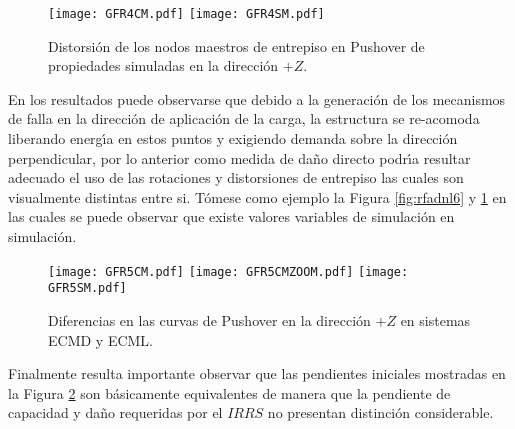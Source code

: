\begin{figure} [htbp]
\texttt{[image: GFR4CM.pdf]}
\texttt{[image: GFR4SM.pdf]}
\caption{Distorsi\'on de los nodos maestros de entrepiso en Pushover de propiedades simuladas en la direcci\'on $+Z$.}
\label{fig:rfadnl7}
\end{figure}

\newpage

En los resultados puede observarse que debido a la generaci\'on de los mecanismos de falla en la direcci\'on de aplicaci\'on de la carga, la estructura se re-acomoda liberando energ\'{\i}a en estos puntos y exigiendo demanda sobre la direcci\'on perpendicular, por lo anterior como medida de da\~no directo podr\'{\i}a resultar adecuado el uso de las rotaciones y distorsiones de entrepiso las cuales son visualmente distintas entre si. T\'omese como ejemplo la Figura \ref{fig:rfadnl6} y \ref{fig:rfadnl7} en las cuales se puede observar que existe valores variables de simulaci\'on en simulaci\'on. 

\begin{figure} [htbp]
\texttt{[image: GFR5CM.pdf]}
\texttt{[image: GFR5CMZOOM.pdf]}
\texttt{[image: GFR5SM.pdf]}
\caption{Diferencias en las curvas de Pushover en la direcci\'on $+Z$ en sistemas ECMD y ECML.}
\label{fig:rfadnl8}
\end{figure}

Finalmente resulta importante observar que las pendientes iniciales mostradas en la Figura \ref{fig:rfadnl8} son b\'asicamente equivalentes de manera que la pendiente de capacidad y da\~no requeridas por el $IRRS$ no presentan distinci\'on considerable.

